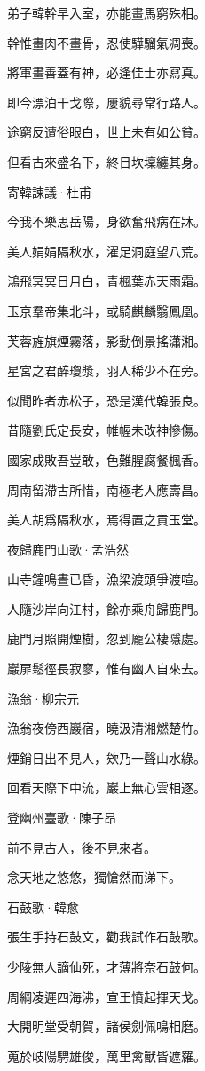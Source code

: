 \documentclass[12pt,a4paper]{ctexbook}
\begin{document}
弟子韓幹早入室，亦能畫馬窮殊相。\par
幹惟畫肉不畫骨，忍使驊騮氣凋喪。\par
將軍畫善蓋有神，必逢佳士亦寫真。\par
即今漂泊干戈際，屢貌尋常行路人。\par
途窮反遭俗眼白，世上未有如公貧。\par
但看古來盛名下，終日坎壈纏其身。\par
寄韓諫議·杜甫\par
今我不樂思岳陽，身欲奮飛病在牀。\par
美人娟娟隔秋水，濯足洞庭望八荒。\par
鴻飛冥冥日月白，青楓葉赤天雨霜。\par
玉京羣帝集北斗，或騎麒麟翳鳳凰。\par
芙蓉旌旗煙霧落，影動倒景搖瀟湘。\par
星宮之君醉瓊漿，羽人稀少不在旁。\par
似聞昨者赤松子，恐是漢代韓張良。\par
昔隨劉氏定長安，帷幄未改神慘傷。\par
國家成敗吾豈敢，色難腥腐餐楓香。\par
周南留滯古所惜，南極老人應壽昌。\par
美人胡爲隔秋水，焉得置之貢玉堂。\par
夜歸鹿門山歌·孟浩然\par
山寺鐘鳴晝已昏，漁梁渡頭爭渡喧。\par
人隨沙岸向江村，餘亦乘舟歸鹿門。\par
鹿門月照開煙樹，忽到龐公棲隱處。\par
巖扉鬆徑長寂寥，惟有幽人自來去。\par
漁翁·柳宗元\par
漁翁夜傍西巖宿，曉汲清湘燃楚竹。\par
煙銷日出不見人，欸乃一聲山水綠。\par
回看天際下中流，巖上無心雲相逐。\par
登幽州臺歌·陳子昂\par
前不見古人，後不見來者。\par
念天地之悠悠，獨愴然而涕下。\par
石鼓歌·韓愈\par
張生手持石鼓文，勸我試作石鼓歌。\par
少陵無人謫仙死，才薄將奈石鼓何。\par
周綱凌遲四海沸，宣王憤起揮天戈。\par
大開明堂受朝賀，諸侯劍佩鳴相磨。\par
蒐於岐陽騁雄俊，萬里禽獸皆遮羅。\par
\end{document}
